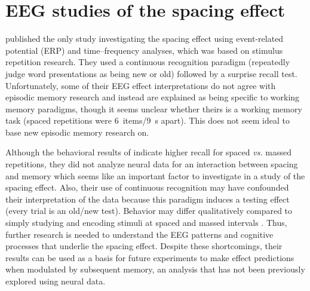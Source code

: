 
\section{EEG studies of the spacing effect}

 published the only study investigating the spacing effect using event-related potential (ERP) and time--frequency analyses, which was based on stimulus repetition research.  They used a continuous recognition paradigm (repeatedly judge word presentations as being new or old) followed by a surprise recall test.
Unfortunately, some of their EEG effect interpretations do not agree with episodic memory research and instead are explained as being specific to working memory paradigms, though it seems unclear whether theirs is a working memory task (spaced repetitions were 6~items/9~s apart).  This does not seem ideal to base new episodic memory research on.


Although the behavioral results of  indicate higher recall for spaced \textit{vs.} massed repetitions, they did not analyze neural data for an interaction between spacing and memory which seems like an important factor to investigate in a study of the spacing effect.  Also, their use of continuous recognition may have confounded their interpretation of the data because this paradigm induces a testing effect (every trial is an old/new test).  Behavior may differ qualitatively compared to simply studying and encoding stimuli at spaced and massed intervals \cite[p.~91]{DelaEtal2010}.
Thus, further research is needed to understand the EEG patterns and cognitive processes that underlie the spacing effect.  Despite these shortcomings, their results can be used as a basis for future experiments to make effect predictions when modulated by subsequent memory, an analysis that has not been previously explored using neural data.






